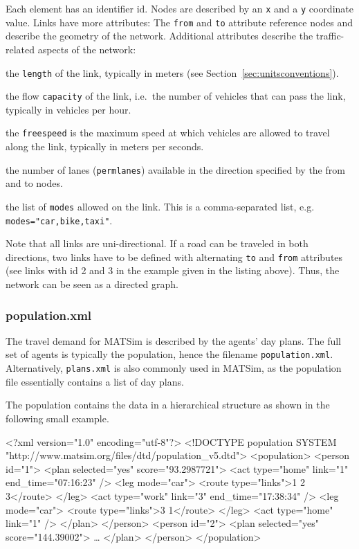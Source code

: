 Each element has an identifier id. Nodes are described by an \lstinline|x| and a \lstinline|y| coordinate value. Links have more attributes: The \lstinline|from| and \lstinline|to| attribute reference nodes and describe the geometry of the network. Additional attributes describe the traffic-related aspects of the network:
\begin{compactitem}
    \item the \lstinline|length| of the link, typically in meters (see Section~\ref{sec:unitsconventions}).
    \item the flow \lstinline|capacity| of the link, i.e.\ the number of vehicles that can pass the link, typically in vehicles per hour.
    \item the \lstinline|freespeed| is the maximum speed at which vehicles are allowed to travel along the link, typically in meters per seconds.
    \item the number of lanes (\lstinline|permlanes|) available in the direction specified by the from and to nodes.
    \item the list of \lstinline|modes| allowed on the link. This is a comma-separated list, e.g.\, \lstinline|modes="car,bike,taxi"|.
\end{compactitem}
Note that all links are uni-directional. If a road can be traveled in both directions, two links have to be defined with alternating \lstinline|to| and \lstinline|from| attributes (see links with id 2 and 3 in the example given in the listing above). Thus, the network can be seen as a directed graph. 

\subsubsection{population.xml}
The travel demand for MATSim is described by the agents' day plans. The full set of agents is typically the population, hence the filename \lstinline|population.xml|. Alternatively, \lstinline|plans.xml| is also commonly used in MATSim, as the population file essentially contains a list of day plans.

The population contains the data in a hierarchical structure as shown in the following small example.

\begin{xml}
<?xml version="1.0" encoding="utf-8"?> 
<!DOCTYPE population SYSTEM "http://www.matsim.org/files/dtd/population_v5.dtd"> 
<population> 
   <person id="1"> 
      <plan selected="yes" score="93.2987721"> 
         <act type="home" link="1" end_time="07:16:23" /> 
         <leg mode="car"> 
            <route type="links">1 2 3</route> 
         </leg> 
         <act type="work" link="3" end_time="17:38:34" /> 
         <leg mode="car"> 
            <route type="links">3 1</route> 
         </leg> 
         <act type="home" link="1" /> 
      </plan> 
   </person> 
   <person id="2"> 
      <plan selected="yes" score="144.39002"> 
         \ldots 
      </plan> 
   </person> 
</population>
\end{xml}


